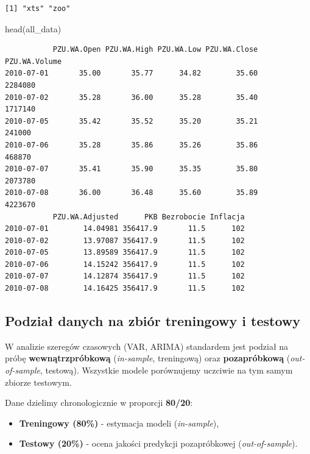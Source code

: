 \documentclass[
  polish,
  letterpaper,
  DIV=11,
  numbers=noendperiod]{scrartcl}
\newenvironment{Shaded}{\begin{snugshade}}{\end{snugshade}}
\newcommand{\FunctionTok}[1]{\textcolor[rgb]{0.28,0.35,0.67}{#1}}
\newcommand{\NormalTok}[1]{\textcolor[rgb]{0.00,0.23,0.31}{#1}}
\providecommand{\tightlist}{%
  \setlength{\itemsep}{0pt}\setlength{\parskip}{0pt}}
\begin{document}
\begin{verbatim}
[1] "xts" "zoo"
\end{verbatim}

\begin{Shaded}
\begin{Highlighting}[]
\FunctionTok{head}\NormalTok{(all\_data)}
\end{Highlighting}
\end{Shaded}

\begin{verbatim}
           PZU.WA.Open PZU.WA.High PZU.WA.Low PZU.WA.Close PZU.WA.Volume
2010-07-01       35.00       35.77      34.82        35.60       2284080
2010-07-02       35.28       36.00      35.28        35.40       1717140
2010-07-05       35.42       35.52      35.20        35.21        241000
2010-07-06       35.28       35.86      35.26        35.86        468870
2010-07-07       35.41       35.90      35.35        35.80       2073780
2010-07-08       36.00       36.48      35.60        35.89       4223670
           PZU.WA.Adjusted      PKB Bezrobocie Inflacja
2010-07-01        14.04981 356417.9       11.5      102
2010-07-02        13.97087 356417.9       11.5      102
2010-07-05        13.89589 356417.9       11.5      102
2010-07-06        14.15242 356417.9       11.5      102
2010-07-07        14.12874 356417.9       11.5      102
2010-07-08        14.16425 356417.9       11.5      102
\end{verbatim}

\subsection{Podział danych na zbiór treningowy i
testowy}\label{podziaux142-danych-na-zbiuxf3r-treningowy-i-testowy}

W analizie szeregów czasowych (VAR, ARIMA) standardem jest podział na
próbę \textbf{wewnątrzpróbkową} (\emph{in-sample}, treningową) oraz
\textbf{pozapróbkową} (\emph{out-of-sample}, testową). Wszystkie modele
porównujemy uczciwie na tym samym zbiorze testowym.

Dane dzielimy chronologicznie w proporcji \textbf{80/20}:

\begin{itemize}
\tightlist
\item
  \textbf{Treningowy (80\%)} - estymacja modeli (\emph{in-sample}),
\item
  \textbf{Testowy (20\%)} - ocena jakości predykcji pozapróbkowej
  (\emph{out-of-sample}).
\end{itemize}
\end{document}
